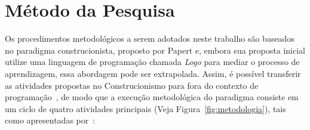 


\section{Método da Pesquisa}\label{sec:metodologia}

Os procedimentos metodológicos a serem adotados neste trabalho são baseados no paradigma construcionista, proposto por Papert e, embora sua proposta inicial utilize uma linguagem de programação chamada \textit{Logo} para mediar o processo de aprendizagem, essa abordagem pode ser extrapolada. Assim, é possível transferir as atividades propostas no Construcionismo para fora do contexto de programação~\citep{Almeida:2000}, de modo que a execução metodológica do paradigma consiste em um ciclo de quatro atividades principais (Veja Figura~\ref{fig:metodologia}), tais como apresentadas por~\cite{Valente:1993}:





